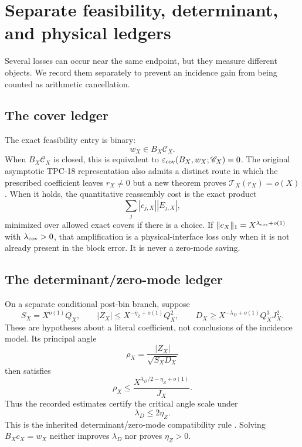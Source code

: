 \section{Separate feasibility, determinant, and physical ledgers}
\label{sec:separate-ledgers}

Several losses can occur near the same endpoint, but they measure
different objects.  We record them separately to prevent an incidence
gain from being counted as arithmetic cancellation.

\subsection{The cover ledger}

The exact feasibility entry is binary:
\begin{equation}
 \boxed{w_X\in B_X\mathscr C_X.}
 \label{eq:cover-ledger}
\end{equation}
When \(B_X\mathscr C_X\) is closed, this is equivalent to
\(\varepsilon_{\mathrm{cov}}(B_X,w_X;\mathscr C_X)=0\).  The original asymptotic
TPC-18 representation also admits a distinct route in which the
prescribed coefficient leaves \(r_X\ne0\) but a new theorem proves
\(\mathcal T_X(r_X)=o(X)\).
When it holds, the quantitative reassembly cost is the exact product
\[
 \sum_j|c_{j,X}||E_{j,X}|,
\]
minimized over allowed exact covers if there is a choice.  If
\(\|c_X\|_1=X^{\lambda_{\mathrm{cov}}+o(1)}\) with
\(\lambda_{\mathrm{cov}}>0\), that amplification is a physical-interface loss
only when it is not already present in the block error.  It is never a
zero-mode saving.

\subsection{The determinant/zero-mode ledger}

On a separate conditional post-bin branch, suppose
\[
 S_X=X^{o(1)}Q_X,\qquad
 |Z_X|\le X^{-\eta_Z+o(1)}Q_X^2,\qquad
 D_X\ge
 X^{-\lambda_D+o(1)}Q_X^3J_X^2.
\]
These are hypotheses about a literal coefficient, not conclusions of
the incidence model.  Its principal angle
\[
 \rho_X=\frac{|Z_X|}{\sqrt{S_XD_X}}
\]
then satisfies
\[
 \rho_X
 \le
 \frac{X^{\lambda_D/2-\eta_Z+o(1)}}{J_X}.
\]
Thus the recorded estimates certify the critical angle scale under
\begin{equation}
 \boxed{\lambda_D\le2\eta_Z.}
 \label{eq:determinant-ledger}
\end{equation}
This is the inherited determinant/zero-mode compatibility rule
\citep{WangTPC89}.  Solving \(B_Xc_X=w_X\) neither improves
\(\lambda_D\) nor proves \(\eta_Z>0\).

